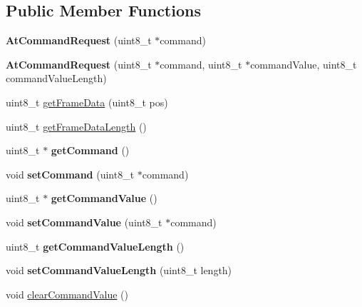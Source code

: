 \subsection*{\-Public \-Member \-Functions}
\begin{DoxyCompactItemize}
\item 
\hypertarget{classAtCommandRequest_ab62a1c4d5cd0d99cfb3e55fccd19f2fa}{{\bfseries \-At\-Command\-Request} (uint8\-\_\-t $\ast$command)}\label{classAtCommandRequest_ab62a1c4d5cd0d99cfb3e55fccd19f2fa}

\item 
\hypertarget{classAtCommandRequest_a20ca09437c349f4b71abbcb0bc007c56}{{\bfseries \-At\-Command\-Request} (uint8\-\_\-t $\ast$command, uint8\-\_\-t $\ast$command\-Value, uint8\-\_\-t command\-Value\-Length)}\label{classAtCommandRequest_a20ca09437c349f4b71abbcb0bc007c56}

\item 
uint8\-\_\-t \hyperlink{classAtCommandRequest_aa4fc8f0c8404172cd5532f3d8e5564f2}{get\-Frame\-Data} (uint8\-\_\-t pos)
\item 
uint8\-\_\-t \hyperlink{classAtCommandRequest_aad12b8357e63fca9e95b6731a4bfda0d}{get\-Frame\-Data\-Length} ()
\item 
\hypertarget{classAtCommandRequest_a5b2607da4f8f66fde9e87c25d575de7a}{uint8\-\_\-t $\ast$ {\bfseries get\-Command} ()}\label{classAtCommandRequest_a5b2607da4f8f66fde9e87c25d575de7a}

\item 
\hypertarget{classAtCommandRequest_aeae10ae23793aae47db036a0700407cc}{void {\bfseries set\-Command} (uint8\-\_\-t $\ast$command)}\label{classAtCommandRequest_aeae10ae23793aae47db036a0700407cc}

\item 
\hypertarget{classAtCommandRequest_a3faa9c8b83960d6464ab718a5f9179fa}{uint8\-\_\-t $\ast$ {\bfseries get\-Command\-Value} ()}\label{classAtCommandRequest_a3faa9c8b83960d6464ab718a5f9179fa}

\item 
\hypertarget{classAtCommandRequest_acd78ffba48b7c860c2be86f4a7787109}{void {\bfseries set\-Command\-Value} (uint8\-\_\-t $\ast$command)}\label{classAtCommandRequest_acd78ffba48b7c860c2be86f4a7787109}

\item 
\hypertarget{classAtCommandRequest_ac5a4595489d7c06779511243b38b99fb}{uint8\-\_\-t {\bfseries get\-Command\-Value\-Length} ()}\label{classAtCommandRequest_ac5a4595489d7c06779511243b38b99fb}

\item 
\hypertarget{classAtCommandRequest_a1fc2fb3033d4c7f1280c0989fd309519}{void {\bfseries set\-Command\-Value\-Length} (uint8\-\_\-t length)}\label{classAtCommandRequest_a1fc2fb3033d4c7f1280c0989fd309519}

\item 
void \hyperlink{classAtCommandRequest_a6842d0e270162c389d804eafd37a4f45}{clear\-Command\-Value} ()
\end{DoxyCompactItemize}



